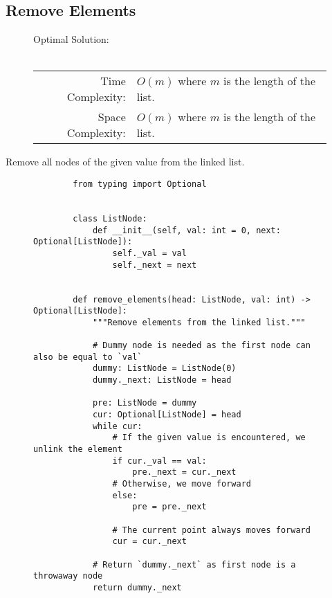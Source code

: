 
\subsection{Remove Elements}

\begin{figure}[H]
    Optimal Solution:\\\\
    \begin{tabular}{rl}
        Time Complexity:& \(O(m)\) where \(m\) is the length of the list.\\
        Space Complexity:& \(O(m)\) where \(m\) is the length of the list.
    \end{tabular}
\end{figure}

Remove all nodes of the given value from the linked list.

\begin{figure}[H]
    \centering
    \begin{verbatim}
        from typing import Optional


        class ListNode:
            def __init__(self, val: int = 0, next: Optional[ListNode]):
                self._val = val
                self._next = next


        def remove_elements(head: ListNode, val: int) -> Optional[ListNode]:
            """Remove elements from the linked list."""

            # Dummy node is needed as the first node can also be equal to `val`
            dummy: ListNode = ListNode(0)
            dummy._next: ListNode = head

            pre: ListNode = dummy
            cur: Optional[ListNode] = head
            while cur:
                # If the given value is encountered, we unlink the element
                if cur._val == val:
                    pre._next = cur._next
                # Otherwise, we move forward
                else:
                    pre = pre._next

                # The current point always moves forward
                cur = cur._next

            # Return `dummy._next` as first node is a throwaway node
            return dummy._next
    \end{verbatim}
\end{figure}
